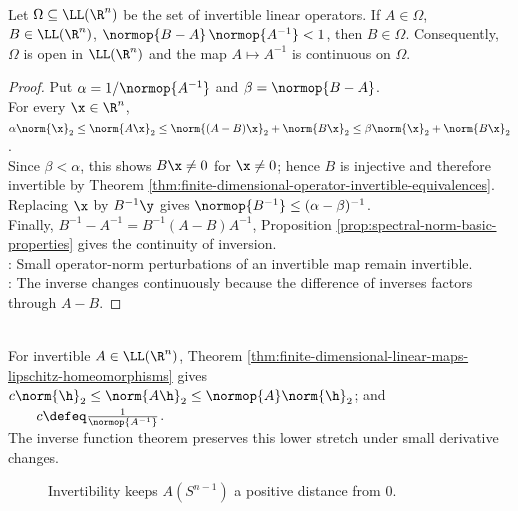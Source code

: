 \begin{theorem} \label{thm:invertible-operators-open-and-inversion-continuous} \\
Let $\Omega\subseteq\LL(\R^n)$ be the set of invertible linear operators. If $A\in\Omega$, $B\in\LL(\R^n)$, $\normop{B-A}\,\normop{A^{-1}}<1$, then $B\in\Omega$. Consequently, $\Omega$ is open in $\LL(\R^n)$ and the map $A\mapsto A^{-1}$ is continuous on $\Omega$.
\begin{proof}
Put $\alpha=1/\normop{A^{-1}}$ and $\beta=\normop{B-A}$.\\
For every $\x\in\R^n$, $\alpha\norm{\x}_2\leq \norm{A\x}_2 \leq \norm{(A-B)\x}_2+\norm{B\x}_2 \leq \beta\norm{\x}_2+\norm{B\x}_2$.\\
Since $\beta<\alpha$, this shows $B\x\neq0$ for $\x\neq0$; hence $B$ is injective and therefore invertible by Theorem \ref{thm:finite-dimensional-operator-invertible-equivalences}.\\
Replacing $\x$ by $B^{-1}\y$ gives $\normop{B^{-1}}\leq(\alpha-\beta)^{-1}$.\\
Finally, $B^{-1}-A^{-1}=B^{-1}(A-B)A^{-1}$, Proposition \ref{prop:spectral-norm-basic-properties} gives the continuity of inversion.\\
: Small operator-norm perturbations of an invertible map remain invertible.\\
: The inverse changes continuously because the difference of inverses factors through $A-B$.
\end{proof}
\end{theorem}

\begin{perspective} \label{per:linear-inverse-lower-bound} \\
For invertible $A\in\LL(\R^n)$, Theorem \ref{thm:finite-dimensional-linear-maps-lipschitz-homeomorphisms} gives $c\norm{\h}_2\leq\norm{A\h}_2\leq\normop{A}\norm{\h}_2$; and $\qquad c\defeq\frac{1}{\normop{A^{-1}}}$.\\
The inverse function theorem preserves this lower stretch under small derivative changes.
\end{perspective}

\begin{figure}[H]
  \centering
  
  \caption{Invertibility keeps $A(S^{n-1})$ a positive distance from $0$.}
  \label{fig:linear-isomorphism-conorm}
\end{figure}

